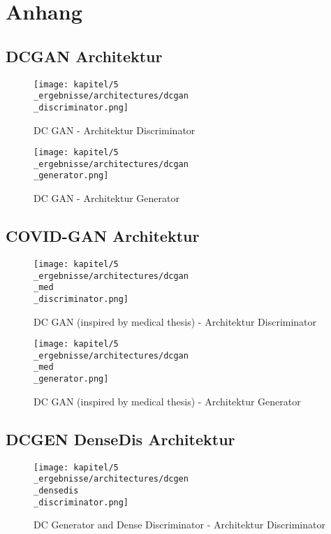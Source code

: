 \chapter{Anhang}
\newpage

\section{DCGAN Architektur}

\begin{figure}[H]
	\centering
	\texttt{[image: kapitel/5\\\_ergebnisse/architectures/dcgan\\\_discriminator.png]}
	\caption{DC GAN - Architektur Discriminator}
	\label{architecture:dcgan-dis}
\end{figure}

\begin{figure}[H]
	\centering
	\texttt{[image: kapitel/5\\\_ergebnisse/architectures/dcgan\\\_generator.png]}
	\caption{DC GAN - Architektur Generator}
	\label{architecture:dcgan-gen}
\end{figure}

\section{COVID-GAN Architektur}
\begin{figure}[H]
	\centering
	\texttt{[image: kapitel/5\\\_ergebnisse/architectures/dcgan\\\_med\\\_discriminator.png]}
	\caption{DC GAN (inspired by medical thesis) - Architektur Discriminator}
	\label{architecture:dcgan-med-dis}
\end{figure}

\begin{figure}[H]
	\centering
	\texttt{[image: kapitel/5\\\_ergebnisse/architectures/dcgan\\\_med\\\_generator.png]}
	\caption{DC GAN (inspired by medical thesis) - Architektur Generator}
	\label{architecture:dcgan-med-gen}
\end{figure}

\section{DCGEN DenseDis Architektur}
\begin{figure}[H]
	\centering
	\texttt{[image: kapitel/5\\\_ergebnisse/architectures/dcgen\\\_densedis\\\_discriminator.png]}
	\caption{DC Generator and Dense Discriminator - Architektur Discriminator}
	\label{architecture:dcgen-densedis-dis}
\end{figure}


